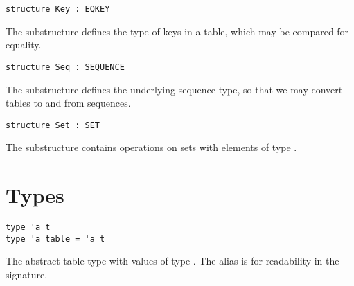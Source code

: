 \begin{cluster}
\label{grp:grm:table-interface::structure}

\begin{gram}
\label{grm:table-interface::structure}
\begin{verbatim}
structure Key : EQKEY
\end{verbatim}
The  substructure defines the type of keys in a table, which may be
compared for equality.

\end{gram}
\end{cluster}

\begin{cluster}
\label{grp:grm:table-interface::sequence}

\begin{gram}
\label{grm:table-interface::sequence}
\begin{verbatim}
structure Seq : SEQUENCE
\end{verbatim}
The  substructure defines the underlying sequence type, so that we
may convert tables to and from sequences.

\end{gram}
\end{cluster}

\begin{cluster}
\label{grp:grm:table-interface::substructure}

\begin{gram}
\label{grm:table-interface::substructure}
\begin{verbatim}
structure Set : SET
\end{verbatim}
The  substructure contains operations on sets with elements of type
.

\end{gram}
\end{cluster}


\section{Types}
\label{sec:table-interface::types}

\begin{cluster}
\label{grp:grm:table-interface::type}

\begin{gram}
\label{grm:table-interface::type}
\begin{verbatim}
type 'a t
type 'a table = 'a t
\end{verbatim}
The abstract table type with values of type . The alias  is
for readability in the signature.

\end{gram}
\end{cluster}


